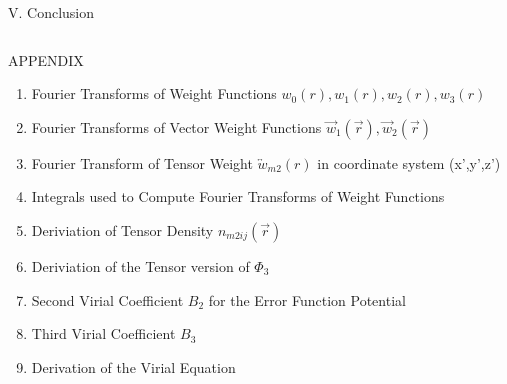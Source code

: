 \documentclass[12pt]{article}
\begin{document}
\[{}\]
\[{}\]
\[{}\]
\[{}\]

\[{}\]
\[{}\]
\[{}\]
\[{}\]

\[{}\]
\[{}\]
\[{}\]
\[{}\]

\[{}\]
\[{}\]
\[{}\]
\[{}\]


\[{}\]
\[{}\]
\[{}\]
\[{}\]

\[{}\]
\[{}\]
\[{}\]
\[{}\]

\noindent V. Conclusion


\[{}\]
\[{}\]
\[{}\]
\[{}\]



APPENDIX
\begin{enumerate}

\item Fourier Transforms of Weight Functions $w_0(r), w_1(r), w_2(r), w_3(r)$
\item Fourier Transforms of Vector Weight Functions $\vec{w}_1(\vec{r}), \vec{w}_2(\vec{r})$  
\item Fourier Transform of Tensor Weight $\overleftrightarrow{w}_{m2}(r)$ in coordinate system (x',y',z')
\item Integrals used to Compute Fourier Transforms of Weight Functions
\item Deriviation of Tensor Density $n_{m2ij}(\vec{r})$ 
\item Deriviation of the Tensor version of $\Phi_3$ 
\item Second Virial Coefficient $B_{2}$ for the Error Function Potential 
\item Third Virial Coefficient $B_{3}$
\item Derivation of the Virial Equation
\end{enumerate}
\end{document}
